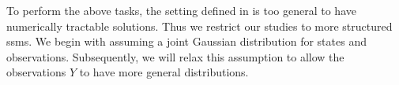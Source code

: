 To perform the above tasks, the setting defined in  is too general to have numerically tractable solutions. Thus we restrict our studies to more structured \glspl{ssm}. We begin with assuming a joint Gaussian distribution for states and observations. Subsequently, we will relax this assumption to allow the observations $Y$ to have more general distributions.





%



